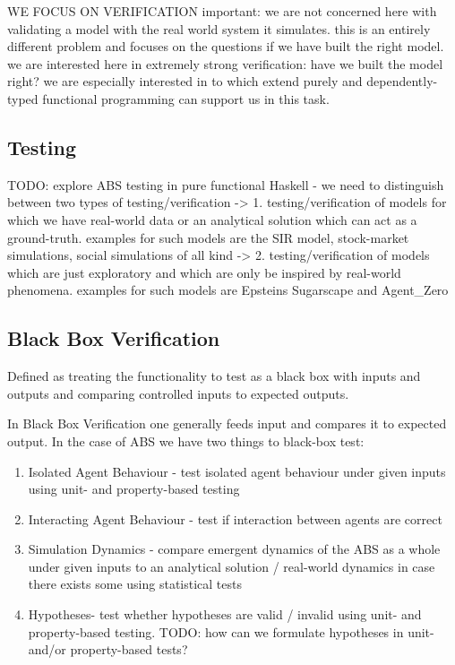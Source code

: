 WE FOCUS ON VERIFICATION
important: we are not concerned here with validating a model with the real world system it simulates. this is an entirely different problem and focuses on the questions if we have built the right model.
we are interested here in extremely strong verification: have we built the model right? we are especially interested in to which extend purely and dependently-typed functional programming can support us in this task.

\subsection{Testing}
TODO: explore ABS testing in pure functional Haskell
- we need to distinguish between two types of testing/verification
	-> 1. testing/verification of models for which we have real-world data or an analytical solution which can act as a ground-truth. examples for such models are the SIR model, stock-market simulations, social simulations of all kind
	-> 2. testing/verification of models which are just exploratory and which are only be inspired by real-world phenomena. examples for such models are Epsteins Sugarscape and Agent\_Zero
	
\subsection{Black Box Verification}
Defined as treating the functionality to test as a black box with inputs and outputs and comparing controlled inputs to expected outputs.

In Black Box Verification one generally feeds input and compares it to expected output. In the case of ABS we have two things to black-box test:
\begin{enumerate}
	\item Isolated Agent Behaviour - test isolated agent behaviour under given inputs using unit- and property-based testing
	\item Interacting Agent Behaviour - test if interaction between agents are correct 
	\item Simulation Dynamics - compare emergent dynamics of the ABS as a whole under given inputs to an analytical solution / real-world dynamics in case there exists some using statistical tests
	\item Hypotheses- test whether hypotheses are valid / invalid using unit- and property-based testing. TODO: how can we formulate hypotheses in unit- and/or property-based tests?
\end{enumerate}

